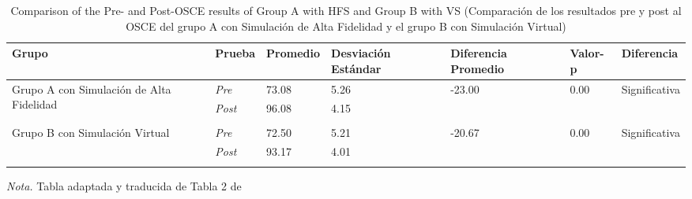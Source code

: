\begin{table}[H]
   \caption{Comparison of the Pre- and Post-OSCE results of Group A with HFS and Group B with VS (Comparación de los resultados pre y post al OSCE del grupo A con Simulación de Alta Fidelidad y el grupo B con Simulación Virtual)}
   \label{tab:tabla-enfermeros}
   \begin{center}
      \begin{tabular}{ p{3cm} p{1cm} p{2cm} p{2cm} p{2cm} p{1cm} p{1cm} }
         \hline
         Grupo & Prueba & Promedio & Desviación Estándar & Diferencia Promedio & Valor-p & Diferencia \\
         \hline
         \multirow{2}{3cm}{Grupo A con Simulación de Alta Fidelidad} & \textit{Pre}  & 73.08 & 5.26 & -23.00 & 0.00 & Significativa \\
                                             & \textit{Post} & 96.08 & 4.15 & ~      & ~    & ~            \\
                                             \\
         \multirow{2}{3cm}{Grupo B con Simulación Virtual}  & \textit{Pre}  & 72.50 & 5.21 & -20.67 & 0.00 & Significativa \\
                                             & \textit{Post} & 93.17 & 4.01 \\
                                             \\
         \hline
      \end{tabular}
   \end{center}
   \textit{Nota.} Tabla adaptada y traducida de Tabla 2 de \textcite{GUERRERO2022100002}
\end{table}
